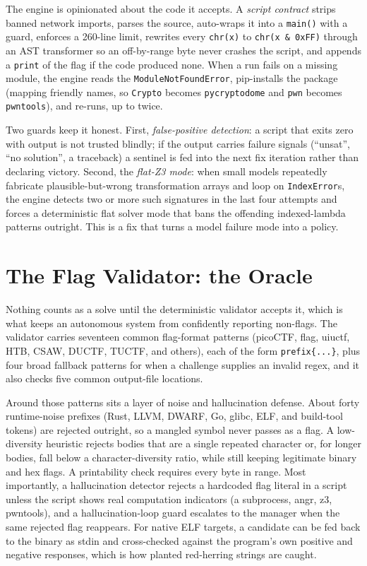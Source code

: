 \documentclass[10pt,twocolumn]{article}
\begin{document}
The engine is opinionated about the code it accepts. A \emph{script contract} strips banned network
imports, parses the source, auto-wraps it into a \texttt{main()} with a guard, enforces a 260-line limit,
rewrites every \texttt{chr(x)} to \texttt{chr(x \& 0xFF)} through an AST transformer so an off-by-range
byte never crashes the script, and appends a \texttt{print} of the flag if the code produced none. When a
run fails on a missing module, the engine reads the \texttt{ModuleNotFoundError}, pip-installs the package
(mapping friendly names, so \texttt{Crypto} becomes \texttt{pycryptodome} and \texttt{pwn} becomes
\texttt{pwntools}), and re-runs, up to twice.

Two guards keep it honest. First, \emph{false-positive detection}: a script that exits zero with output
is not trusted blindly; if the output carries failure signals (``unsat'', ``no solution'', a traceback) a
sentinel is fed into the next fix iteration rather than declaring victory. Second, the \emph{flat-Z3 mode}:
when small models repeatedly fabricate plausible-but-wrong transformation arrays and loop on
\texttt{IndexError}s, the engine detects two or more such signatures in the last four attempts and forces a
deterministic flat solver mode that bans the offending indexed-lambda patterns outright. This is a fix that
turns a model failure mode into a policy.

\section{The Flag Validator: the Oracle}
\label{sec:validator}

Nothing counts as a solve until the deterministic validator accepts it, which is what keeps an autonomous
system from confidently reporting non-flags. The validator carries seventeen common flag-format patterns
(picoCTF, flag, uiuctf, HTB, CSAW, DUCTF, TUCTF, and others), each of the form \texttt{prefix\{...\}}, plus
four broad fallback patterns for when a challenge supplies an invalid regex, and it also checks five common
output-file locations.

Around those patterns sits a layer of noise and hallucination defense. About forty runtime-noise prefixes
(Rust, LLVM, DWARF, Go, glibc, ELF, and build-tool tokens) are rejected outright, so a mangled symbol never
passes as a flag. A low-diversity heuristic rejects bodies that are a single repeated character or, for
longer bodies, fall below a character-diversity ratio, while still keeping legitimate binary and hex flags.
A printability check requires every byte in range. Most importantly, a hallucination detector rejects a
hardcoded flag literal in a script unless the script shows real computation indicators (a subprocess,
angr, z3, pwntools), and a hallucination-loop guard escalates to the manager when the same rejected flag
reappears. For native ELF targets, a candidate can be fed back to the binary as stdin and cross-checked
against the program's own positive and negative responses, which is how planted red-herring strings are
caught.
\end{document}

